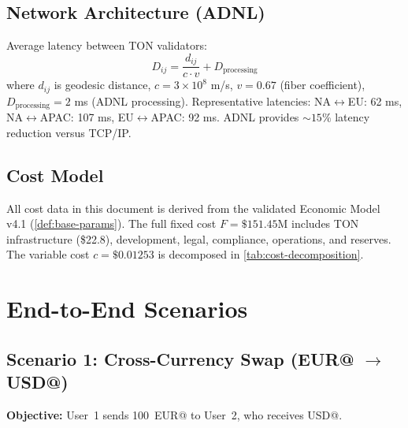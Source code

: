 \documentclass[12pt,a4paper]{article}
\theoremstyle{definition}
\theoremstyle{remark}
\newcommand{\USD}[1]{\$#1}
\begin{document}
\subsection{Network Architecture (ADNL)}

Average latency between TON validators:
\begin{equation}
D_{ij} = \frac{d_{ij}}{c \cdot v} + D_{\text{processing}}
\end{equation}
where $d_{ij}$ is geodesic distance, $c = 3 \times 10^8$ m/s, $v = 0.67$ (fiber coefficient), $D_{\text{processing}} = 2$ ms (ADNL processing). Representative latencies: NA$\leftrightarrow$EU: 62 ms, NA$\leftrightarrow$APAC: 107 ms, EU$\leftrightarrow$APAC: 92 ms. ADNL provides ${\sim}15\%$ latency reduction versus TCP/IP.

\subsection{Cost Model}

All cost data in this document is derived from the validated Economic Model v4.1 (\cref{def:base-params}). The full fixed cost $F = \USD{151.45\text{M}}$ includes TON infrastructure (\USD{22.8}), development, legal, compliance, operations, and reserves. The variable cost $c = \USD{0.01253}$ is decomposed in \cref{tab:cost-decomposition}.


\section{End-to-End Scenarios}
\label{sec:scenarios}

\subsection{Scenario 1: Cross-Currency Swap (EUR@ $\to$ USD@)}

\textbf{Objective:} User~1 sends 100~EUR@ to User~2, who receives USD@.
\end{document}
